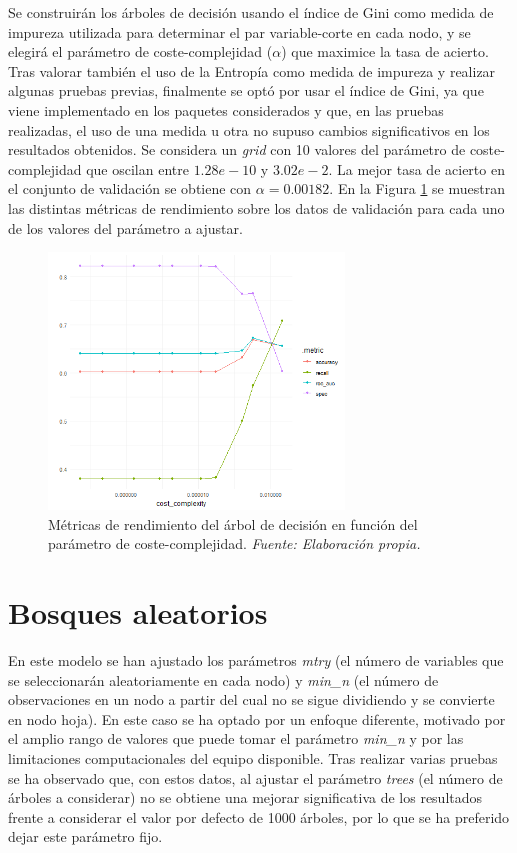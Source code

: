 \documentclass[12pt,a4paper,]{book}
\numberwithin{dummy}{section}
\theoremstyle{ocrenumbox}
\theoremstyle{blacknumex}
\theoremstyle{blacknumbox}
\theoremstyle{ocrenum}
\theoremstyle{ocrenum}
\begin{document}
Se construirán los árboles de decisión usando el índice de Gini como
medida de impureza utilizada para determinar el par variable-corte en
cada nodo, y se elegirá el parámetro de coste-complejidad (\(\alpha\))
que maximice la tasa de acierto. Tras valorar también el uso de la
Entropía como medida de impureza y realizar algunas pruebas previas,
finalmente se optó por usar el índice de Gini, ya que viene implementado
en los paquetes considerados y que, en las pruebas realizadas, el uso de
una medida u otra no supuso cambios significativos en los resultados
obtenidos. Se considera un \emph{grid} con 10 valores del parámetro de
coste-complejidad que oscilan entre \(1.28e-10\) y \(3.02e- 2\). La
mejor tasa de acierto en el conjunto de validación se obtiene con
\(\alpha = 0.00182\). En la Figura \ref{fig:dt_tuningplot} se muestran
las distintas métricas de rendimiento sobre los datos de validación para
cada uno de los valores del parámetro a ajustar.

\begin{figure}[h!]
\centering
\includegraphics[width =0.7\textwidth]{graficos/dt_tuningplot.png}
\caption[Métricas de rendimiento del árbol de decisión en función de $\alpha$]{Métricas de rendimiento del árbol de decisión en función del parámetro de coste-complejidad. \it Fuente: Elaboración propia.}
\label{fig:dt_tuningplot}
\end{figure}

\hypertarget{bosques-aleatorios}{%
\section{Bosques aleatorios}\label{bosques-aleatorios}}

En este modelo se han ajustado los parámetros \emph{mtry} (el número de
variables que se seleccionarán aleatoriamente en cada nodo) y
\emph{min\_n} (el número de observaciones en un nodo a partir del cual
no se sigue dividiendo y se convierte en nodo hoja). En este caso se ha
optado por un enfoque diferente, motivado por el amplio rango de valores
que puede tomar el parámetro \emph{min\_n} y por las limitaciones
computacionales del equipo disponible. Tras realizar varias pruebas se
ha observado que, con estos datos, al ajustar el parámetro \emph{trees}
(el número de árboles a considerar) no se obtiene una mejorar
significativa de los resultados frente a considerar el valor por defecto
de 1000 árboles, por lo que se ha preferido dejar este parámetro fijo.
\end{document}
